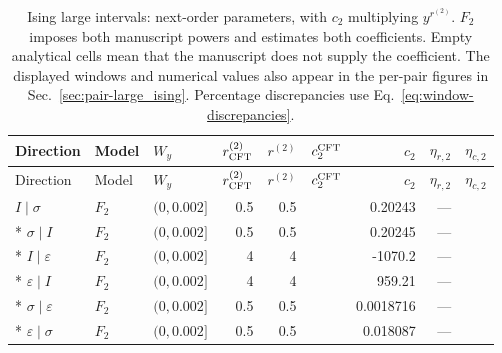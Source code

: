\begingroup\setlength{\tabcolsep}{2pt}
\begin{longtable}{lllrrrrrr}
\caption{Ising large intervals: next-order parameters, with $c_2$ multiplying $y^{r^{(2)}}$. $F_2$ imposes both manuscript powers and estimates both coefficients. Empty analytical cells mean that the manuscript does not supply the coefficient. The displayed windows and numerical values also appear in the per-pair figures in Sec.~\ref{sec:pair-large_ising}. Percentage discrepancies use Eq.~\eqref{eq:window-discrepancies}.}
\label{tab:window-large_ising-second}\\\toprule
Direction & Model & $W_y$ & $r^{(2)}_{\rm CFT}$ & $r^{(2)}$ & $c_2^{\rm CFT}$ & $c_2$ & $\eta_{r,2}$ & $\eta_{c,2}$\\\midrule
\endfirsthead
\toprule
Direction & Model & $W_y$ & $r^{(2)}_{\rm CFT}$ & $r^{(2)}$ & $c_2^{\rm CFT}$ & $c_2$ & $\eta_{r,2}$ & $\eta_{c,2}$\\\midrule
\endhead
\bottomrule\endfoot
$I\mid \sigma$ & $F_2$ & $(0,0.002]$ & 0.5 & 0.5 &  & 0.20243 & --- & \\*
$\sigma\mid I$ & $F_2$ & $(0,0.002]$ & 0.5 & 0.5 &  & 0.20245 & --- & \\*
$I\mid \varepsilon$ & $F_2$ & $(0,0.002]$ & 4 & 4 &  & -1070.2 & --- & \\*
$\varepsilon\mid I$ & $F_2$ & $(0,0.002]$ & 4 & 4 &  & 959.21 & --- & \\*
$\sigma\mid \varepsilon$ & $F_2$ & $(0,0.002]$ & 0.5 & 0.5 &  & 0.0018716 & --- & \\*
$\varepsilon\mid \sigma$ & $F_2$ & $(0,0.002]$ & 0.5 & 0.5 &  & 0.018087 & --- & \\
\end{longtable}
\endgroup
